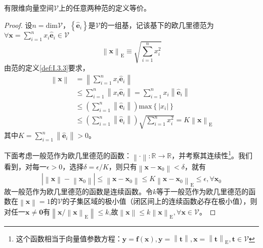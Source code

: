 \documentclass[main.tex]{subfiles}
\begin{document}
\begin{theorem}\label{thm:II.3.1}
有限维向量空间$\mathcal{V}$上的任意两种范的定义等价。
\end{theorem}
\begin{proof}
设$n=\mathrm{dim}\mathcal{V}$，$\left\{\mathbf{\hat{e}}_i\right\}$是$\mathcal{V}$的一组基，记该基下的欧几里德范为$\forall\mathbf{x}=\sum_{i=1}^nx_i\mathbf{\hat{e}}_i\in\mathcal{V}$
\[\left\|\mathbf{x}\right\|_\mathrm{E}\equiv\sqrt{\sum_{i=1}^n x_i^2}\]
由范的定义\ref{def:I.3.3}要求，
\begin{align*}
\left\|\mathbf{x}\right\|&=\left\|\sum_{i=1}^nx_i\mathbf{\hat{e}}_i\right\|\\
&\leq \sum_{i=1}^n\left\|x_i\mathbf{\hat{e}}_i\right\|=\sum_{i=1}^nx_i\left\|\mathbf{\hat{e}}_i\right\|\\
&\leq \left(\sum_{i=1}^n\left\|\mathbf{\hat{e}}_i\right\|\right)\mathrm{max}\left\{\left|x_i\right|\right\}\\
&\leq \left(\sum_{i=1}^n\left\|\mathbf{\hat{e}}_i\right\|\right)\sqrt{\sum_{i=1}^nx_i^2}= K\left\|\mathbf{x}\right\|_\mathrm{E}
\end{align*}
其中$K=\sum_{i=1}^n\left\|\mathbf{\hat{e}}_i\right\|>0$。

下面考虑一般范作为欧几里德范的函数：$\left\|\cdot\right\|:\mathbb{R}\rightarrow\mathbb{R}$，并考察其连续性\footnote{这个函数相当于向量值参数方程：$\mathbf{y}=\mathbf{f}\left(\mathbf{x}\right),\mathbf{y}=\left\|\mathbf{t}\right\|,\mathbf{x}=\left\|\mathbf{t}\right\|_\mathrm{E},\mathbf{t}\in\mathcal{V}$}。我们看到，对每一$\epsilon>0$，选择$\delta=\epsilon/K$，则只有$\left\|\mathbf{x}-\mathbf{x}_0\right\|<\delta$，就有
\[
\left|\left\|\mathbf{x}\right\|-\left\|\mathbf{x}_0\right\|\right|\leq\left\|\mathbf{x}-\mathbf{x}_0\right\|\leq K\left\|\mathbf{x}-\mathbf{x}_0\right\|_\mathrm{E}\leq\epsilon,\forall\mathbf{x}_0\]
故一般范作为欧几里德范的函数是连续函数。令$k$等于一般范作为欧几里德范的函数在$\left\|\mathbf{x}\right\|=1$的$\mathcal{V}$的子集区域的极小值（闭区间上的连续函数必存在极小值），则对任一$\mathbf{x}\neq\mathbf{0}$有$\left\|\mathbf{x}/\left\|\mathbf{x}\right\|_\mathrm{E}\right\|\leq k$,故$\left\|\mathbf{x}\right\|\leq k\left\|\mathbf{x}\right\|_\mathrm{E},\forall \mathbf{x}\in\mathcal{V}$。
\end{proof}
\end{document}
